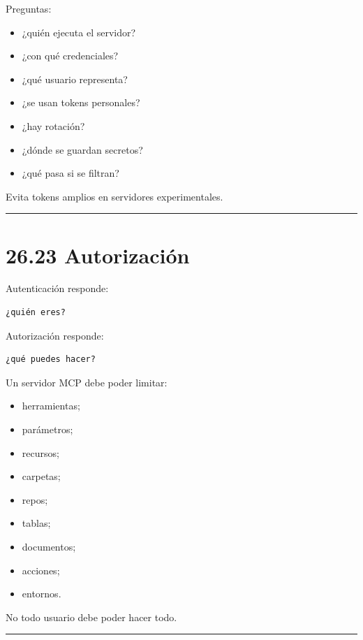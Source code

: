 Preguntas:

\begin{itemize}
\tightlist
\item
  ¿quién ejecuta el servidor?
\item
  ¿con qué credenciales?
\item
  ¿qué usuario representa?
\item
  ¿se usan tokens personales?
\item
  ¿hay rotación?
\item
  ¿dónde se guardan secretos?
\item
  ¿qué pasa si se filtran?
\end{itemize}

Evita tokens amplios en servidores experimentales.

\begin{center}\rule{0.5\linewidth}{0.5pt}\end{center}

\section{26.23 Autorización}\label{autorizaciuxf3n}

Autenticación responde:

\begin{lstlisting}
¿quién eres?
\end{lstlisting}

Autorización responde:

\begin{lstlisting}
¿qué puedes hacer?
\end{lstlisting}

Un servidor MCP debe poder limitar:

\begin{itemize}
\tightlist
\item
  herramientas;
\item
  parámetros;
\item
  recursos;
\item
  carpetas;
\item
  repos;
\item
  tablas;
\item
  documentos;
\item
  acciones;
\item
  entornos.
\end{itemize}

No todo usuario debe poder hacer todo.

\begin{center}\rule{0.5\linewidth}{0.5pt}\end{center}

